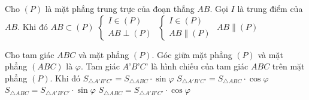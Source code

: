 \begin{ex}%
Cho $\left( P \right)$ là mặt phẳng trung trực của đoạn thẳng $AB$. Gọi $I$ là trung điểm của $AB$. Khi đó
	\choice
	{$AB \subset \left( P \right)$}
	{\True $\begin{cases} I \in \left( P \right) \\ AB \perp \left( P \right) \end{cases}$}
	{$\begin{cases} I \in \left( P \right) \\ AB \parallel \left( P \right) \end{cases}$}
	{$AB\parallel \left( P \right)$}
\end{ex}

\begin{ex}%
Cho tam giác $ABC$ và mặt phẳng $(P)$. Góc giữa mặt phẳng $(P)$ và mặt phẳng $(ABC)$ là $\varphi$. Tam giác $A’B’C’$ là hình chiếu của tam giác $ABC$ trên mặt phẳng $(P)$. Khi đó
	\choice
	{$S_{\triangle A'B'C'} = S_{\triangle ABC} \cdot \sin \varphi$}
	{\True $S_{\triangle A'B'C'} = S_{\triangle ABC} \cdot \cos \varphi$}
	{$S_{\triangle ABC} = S_{\triangle A'B'C'} \cdot \sin \varphi$}
	{$S_{\triangle ABC} = S_{\triangle A'B'C'} \cdot \cos \varphi$}
\end{ex}

